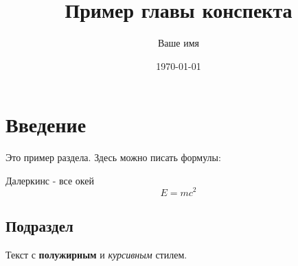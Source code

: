 \documentclass{article}
\title{Пример главы конспекта}
\author{Ваше имя}
\date{\today}
\begin{document}
\maketitle

\section{Введение}
Это пример раздела. Здесь можно писать формулы:

Далеркинс - все окей
\[ E = mc^2 \]

\subsection{Подраздел}
Текст с \textbf{полужирным} и \emph{курсивным} стилем.
\end{document}
